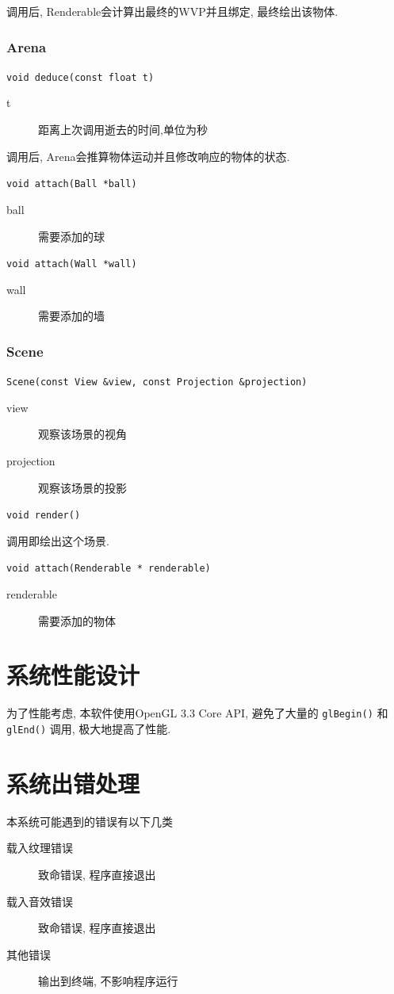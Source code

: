 \documentclass[11pt]{article}
\begin{document}
调用后, Renderable会计算出最终的WVP并且绑定, 最终绘出该物体.

\subsubsection{Arena}
\label{sec-4-1-3}

\texttt{void deduce(const float t)}
\begin{description}
\item[{t}] 距离上次调用逝去的时间,单位为秒
\end{description}
调用后, Arena会推算物体运动并且修改响应的物体的状态.



\texttt{void attach(Ball *ball)}
\begin{description}
\item[{ball}] 需要添加的球
\end{description}



\texttt{void attach(Wall *wall)}
\begin{description}
\item[{wall}] 需要添加的墙
\end{description}

\subsubsection{Scene}
\label{sec-4-1-4}

\texttt{Scene(const View \&view, const Projection \&projection)}
\begin{description}
\item[{view}] 观察该场景的视角
\item[{projection}] 观察该场景的投影
\end{description}


\texttt{void render()}

调用即绘出这个场景.

\texttt{void attach(Renderable * renderable)}
\begin{description}
\item[{renderable}] 需要添加的物体
\end{description}
\section{系统性能设计}
\label{sec-5}
为了性能考虑, 本软件使用OpenGL 3.3 Core API, 避免了大量的
\texttt{glBegin()} 和 \texttt{glEnd()} 调用, 极大地提高了性能.  
\section{系统出错处理}
\label{sec-6}
本系统可能遇到的错误有以下几类
\begin{description}
\item[{载入纹理错误}] 致命错误, 程序直接退出
\item[{载入音效错误}] 致命错误, 程序直接退出
\item[{其他错误}] 输出到终端, 不影响程序运行
\end{description}
\end{document}
